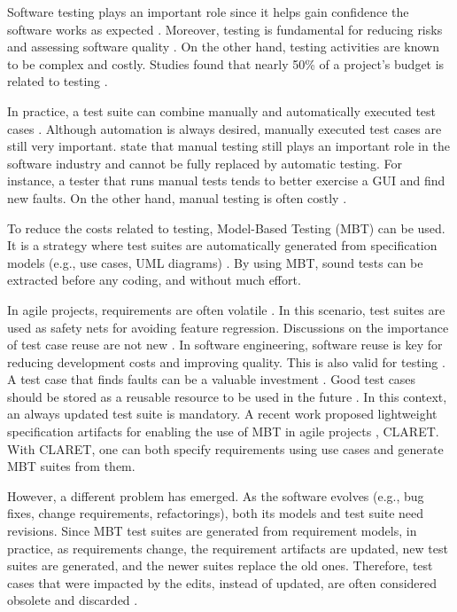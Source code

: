 Software testing plays an important role since it helps gain confidence the software works as expected \citep{Pressman:2007}. Moreover, testing is fundamental for reducing risks and assessing software quality \citep{Pressman:2007}. On the other hand, testing activities are known to be complex and costly. Studies found that nearly 50\% of a project's budget is related to testing \citep{kumar2016impacts}. 

In practice, a test suite can combine manually and automatically executed test cases \citep{manualtesting:2009:Itkonen}. Although automation is always desired, manually executed test cases are still very important. \citet{manualtesting:2009:Itkonen} state that manual testing still plays an important role in the software industry and cannot be fully replaced by automatic testing. For instance, a tester that runs manual tests tends to better exercise a GUI and find new faults. On the other hand, manual testing is often costly \citep{harrold2000testing}.

To reduce the costs related to testing, Model-Based Testing (MBT) can be used. It is a strategy where test suites are automatically generated from specification models (e.g., use cases, UML diagrams) \citep{dalal:mbt:1999,Utting:2006:PMT:1200168}. By using MBT, sound tests can be extracted before any coding, and without much effort.


In agile projects, requirements are often volatile \citep{beck2000extremeprogramming,sutherland2014scrum}. In this scenario, test suites are used as safety nets for avoiding feature regression. Discussions on the importance of test case reuse are not new \citep{von1994domain}. In software engineering, software reuse is key for reducing development costs and improving quality. This is also valid for testing \citep{frakes1994systematic}. A test case that finds faults can be a valuable investment \citep{myers2011art}. Good test cases should be stored as a reusable resource to be used in the future \citep{cai2009test}. In this context, an always updated test suite is mandatory. A recent work proposed lightweight specification artifacts for enabling the use of MBT in agile projects \citep{dalton2018mbtagile}, CLARET. With CLARET, one can both specify requirements using use cases and generate MBT suites from them.


However, a different problem has emerged. As the software evolves (e.g., bug fixes, change requirements, refactorings), both its models and test suite need revisions. Since MBT test suites are generated from requirement models, in practice, as requirements change, the requirement artifacts are updated, new test suites are generated, and the newer suites replace the old ones. Therefore, test cases that were impacted by the edits, instead of updated, are often considered obsolete and discarded \citep{de2016full}. 


